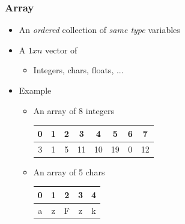 \documentclass{../c-lecture}
\begin{document}
\begin{frame}
  \frametitle{Array}
  \begin{itemize}
    \item
      An \textit{\color{Orange} ordered} collection of
      \textit{\color{Orange} same type} variables

    \item A $1 x n$ vector of
    \begin{itemize}
      \item Integers, chars, floats, ...
    \end{itemize}
    \item Example
    \begin{itemize}
      \item An array of 8 integers
      \begin{table}
      \begin{tabular}{*{8}{c}}
        \toprule

        0 &
        1 &
        2 &
        3 &
        4 &
        5 &
        6 &
        7 \\

        \midrule

        3 &
        1 &
        5 &
        11 &
        10 &
        19 &
        0 &
        12 \\

        \bottomrule
      \end{tabular}
      \end{table}
      \item An array of 5 chars
      \begin{table}
      \begin{tabular}{*{5}{c}}
        \toprule

        0 &
        1 &
        2 &
        3 &
        4 \\

        \midrule

        a &
        z &
        F &
        z &
        k \\

        \bottomrule
      \end{tabular}
      \end{table}
    \end{itemize}
  \end{itemize}
\end{frame}
\end{document}
